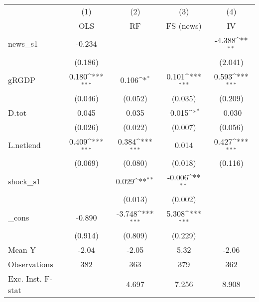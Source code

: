 {
\def\sym#1{\ifmmode^{#1}\else\(^{#1}\)\fi}
\begin{tabular}{l*{4}{c}}
\toprule
            &\multicolumn{1}{c}{(1)}&\multicolumn{1}{c}{(2)}&\multicolumn{1}{c}{(3)}&\multicolumn{1}{c}{(4)}\\
            &\multicolumn{1}{c}{OLS}&\multicolumn{1}{c}{RF}&\multicolumn{1}{c}{FS (news)}&\multicolumn{1}{c}{IV}\\
\midrule
news\_s1     &      -0.234         &                     &                     &      -4.388\sym{**} \\
            &     (0.186)         &                     &                     &     (2.041)         \\
\addlinespace
gRGDP       &       0.180\sym{***}&       0.106\sym{*}  &       0.101\sym{***}&       0.593\sym{***}\\
            &     (0.046)         &     (0.052)         &     (0.035)         &     (0.209)         \\
\addlinespace
D.tot       &       0.045         &       0.035         &      -0.015\sym{*}  &      -0.030         \\
            &     (0.026)         &     (0.022)         &     (0.007)         &     (0.056)         \\
\addlinespace
L.netlend   &       0.409\sym{***}&       0.384\sym{***}&       0.014         &       0.427\sym{***}\\
            &     (0.069)         &     (0.080)         &     (0.018)         &     (0.116)         \\
\addlinespace
shock\_s1    &                     &       0.029\sym{**} &      -0.006\sym{**} &                     \\
            &                     &     (0.013)         &     (0.002)         &                     \\
\addlinespace
\_cons      &      -0.890         &      -3.748\sym{***}&       5.308\sym{***}&                     \\
            &     (0.914)         &     (0.809)         &     (0.229)         &                     \\
\midrule
Mean Y      &       -2.04         &       -2.05         &        5.32         &       -2.06         \\
Observations&         382         &         363         &         379         &         362         \\
Exc. Inst. F-stat&                     &       4.697         &       7.256         &       8.908         \\
\bottomrule
\end{tabular}
}
